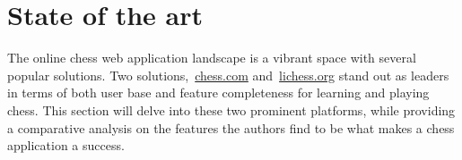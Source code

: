 \section{State of the art}\label{sec:state-of-the-art}

The online chess web application landscape is a vibrant space with several popular
solutions.
Two solutions,~\url{chess.com} and~\url{lichess.org} stand out as leaders in terms
of both user base and feature completeness for learning and playing chess.
This section will delve into these two prominent platforms, while providing a
comparative analysis on the features the authors find to be what makes a
chess application a success.




